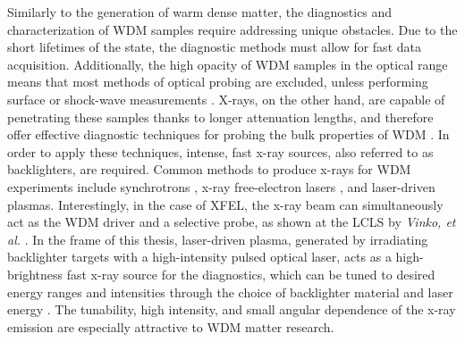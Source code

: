 Similarly to the generation of warm dense matter, the diagnostics and characterization of WDM samples require addressing unique obstacles. Due to the short lifetimes of the state, the diagnostic methods must allow for fast data acquisition. Additionally, the high opacity of WDM samples in the 
optical 
range means that most methods of optical probing are excluded, 
unless performing surface or shock-wave measurements 
\citep{riley2021warm, schoenberg2020high, 
falk2018experimental}. X-rays, on the other hand, are 
capable of penetrating these samples thanks to longer 
attenuation lengths, and therefore 
offer effective diagnostic techniques for probing the 
bulk properties of WDM \citep{torchio2016probing, 
bagnoud2010commissioning}. In order to apply these techniques, intense, fast x-ray sources, also referred to as backlighters, are required. Common methods to produce 
x-rays for WDM experiments include synchrotrons 
\citep{torchio2016probing}, x-ray free-electron lasers \citep{lee2003finite}, and 
laser-driven plasmas. Interestingly, in the case of XFEL, the x-ray beam can simultaneously act as the WDM driver and a selective probe, as shown at the LCLS by \textit{Vinko, et al.} \citep{vinko2012creation}. In the frame of this thesis, laser-driven plasma, generated by
irradiating backlighter targets with a
high-intensity pulsed optical laser, acts as a high-brightness fast x-ray source for the diagnostics, which can be 
tuned to desired energy ranges and intensities 
through the choice of backlighter material and laser 
energy \citep{bagnoud2010commissioning}. The 
tunability, high intensity, and small angular 
dependence of the x-ray emission are especially attractive to WDM 
matter research.

